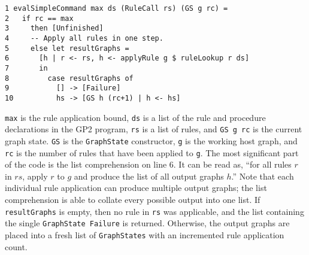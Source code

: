 \begin{verbatim}
1 evalSimpleCommand max ds (RuleCall rs) (GS g rc) = 
2   if rc == max 
3     then [Unfinished]
4     -- Apply all rules in one step.
5     else let resultGraphs = 
6       [h | r <- rs, h <- applyRule g $ ruleLookup r ds] 
7       in
8         case resultGraphs of
9           [] -> [Failure]
10          hs -> [GS h (rc+1) | h <- hs]
\end{verbatim}

\texttt{max} is the rule application bound, \texttt{ds} is a list of the rule and procedure declarations in the GP2 program, \texttt{rs} is a list of rules, and \texttt{GS g rc} is the current graph state. \texttt{GS} is the \texttt{GraphState} constructor, \texttt{g} is the working host graph, and \texttt{rc} is the number of rules that have been applied to \texttt{g}. The most significant part of the code is the list comprehension on line 6. It can be read as, ``for all rules $r$ in $rs$, apply $r$ to $g$ and produce the list of all output graphs $h$.'' Note that each individual rule application can produce multiple output graphs; the list comprehension is able to collate every possible output into one list. If \texttt{resultGraphs} is empty, then no rule in \texttt{rs} was applicable, and the list containing the single \texttt{GraphState Failure} is returned. Otherwise, the output graphs are placed into a fresh list of \texttt{GraphStates} with an incremented rule application count.

